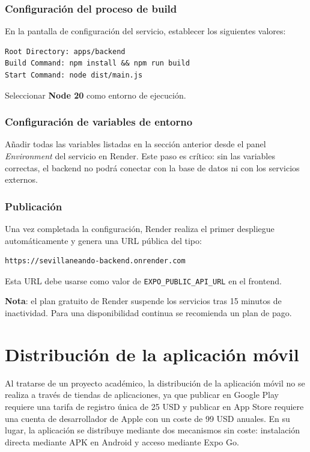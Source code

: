 \subsubsection{Configuración del proceso de build}

En la pantalla de configuración del servicio, establecer los siguientes valores:

\begin{lstlisting}
Root Directory: apps/backend
Build Command: npm install && npm run build
Start Command: node dist/main.js
\end{lstlisting}

Seleccionar \textbf{Node 20} como entorno de ejecución.

\subsubsection{Configuración de variables de entorno}

Añadir todas las variables listadas en la sección anterior desde el panel \textit{Environment} del servicio en Render. Este paso es crítico: sin las variables correctas, el backend no podrá conectar con la base de datos ni con los servicios externos.

\subsubsection{Publicación}

Una vez completada la configuración, Render realiza el primer despliegue automáticamente y genera una URL pública del tipo:

\begin{lstlisting}
https://sevillaneando-backend.onrender.com
\end{lstlisting}

Esta URL debe usarse como valor de \texttt{EXPO\_PUBLIC\_API\_URL} en el frontend.

\textbf{Nota}: el plan gratuito de Render suspende los servicios tras 15 minutos de inactividad. Para una disponibilidad continua se recomienda un plan de pago.

\section{Distribución de la aplicación móvil}

Al tratarse de un proyecto académico, la distribución de la aplicación móvil no se realiza a través de tiendas de aplicaciones, ya que publicar en Google Play requiere una tarifa de registro única de 25 USD y publicar en App Store requiere una cuenta de desarrollador de Apple con un coste de 99 USD anuales. En su lugar, la aplicación se distribuye mediante dos mecanismos sin coste: instalación directa mediante APK en Android y acceso mediante Expo Go.

